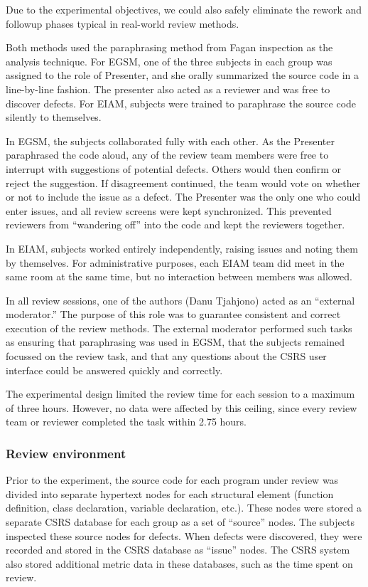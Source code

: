Due to the experimental objectives, we could also safely eliminate the
rework and followup phases typical in real-world review methods.

Both methods used the paraphrasing method from Fagan inspection as the
analysis technique.  For EGSM, one of the three subjects in each group was
assigned to the role of Presenter, and she orally summarized the
source code in a line-by-line fashion.  The presenter also acted as a
reviewer and was free to discover defects. For EIAM, subjects were 
trained to paraphrase the source code silently to themselves.

In EGSM, the subjects collaborated fully with each other. As the Presenter
paraphrased the code aloud, any of the review team members were free to interrupt
with suggestions of potential defects. Others would then confirm or reject
the suggestion.  If disagreement continued, the team would vote on whether
or not to include the issue as a defect.  The Presenter was the only one
who could enter issues, and all review screens were kept synchronized. This
prevented reviewers from ``wandering off'' into the code and kept the
reviewers together.

In EIAM, subjects worked entirely independently, raising issues and noting
them by themselves. For administrative purposes, each EIAM team did meet in
the same room at the same time, but no interaction between members was
allowed.

In all review sessions, one of the authors (Danu Tjahjono) acted as an
``external moderator.''  The purpose of this role was to guarantee
consistent and correct execution of the review methods. The external
moderator performed such tasks as ensuring that paraphrasing was used in
EGSM, that the subjects remained focussed on the review task, and that any
questions about the CSRS user interface could be answered quickly and
correctly.

The experimental design limited the review time for each session to a
maximum of three hours.  However, no data were affected by this ceiling,
since every review team or reviewer completed the task within 2.75 hours.

\subsubsection{Review environment}

Prior to the experiment, the source code for each program under review was
divided into separate hypertext nodes for each structural element (function
definition, class declaration, variable declaration, etc.).  These nodes
were stored a separate CSRS database for each group as a set of ``source''
nodes. The subjects inspected these source nodes for defects.  When defects
were discovered, they were recorded and stored in the CSRS database as
``issue'' nodes. The CSRS system also stored additional metric data in
these databases, such as the time spent on review.  

